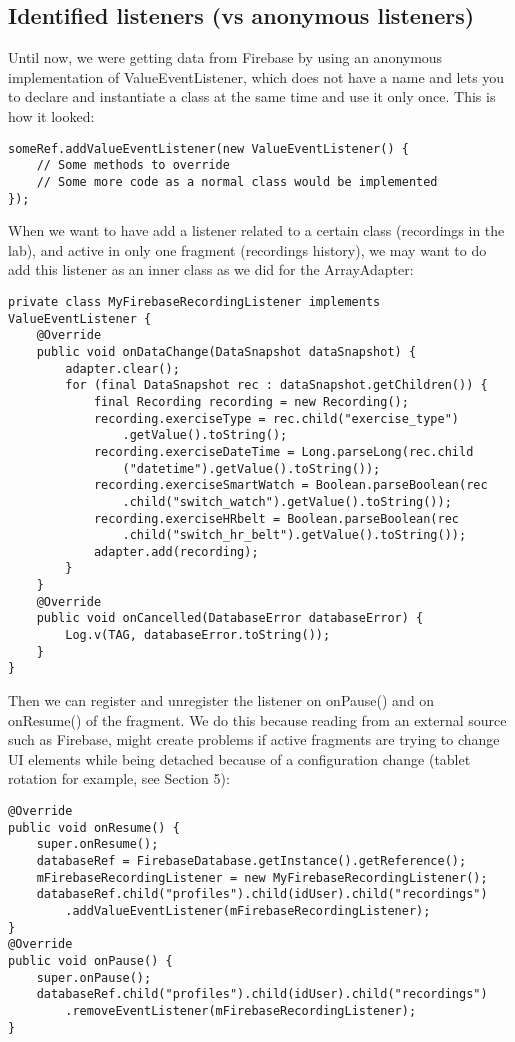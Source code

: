 \documentclass[11pt]{article}
\begin{document}
\subsection{Identified listeners (vs anonymous listeners)}
Until now, we were getting data from Firebase by using an anonymous implementation of ValueEventListener, which does not have a name and lets you to declare and instantiate a class at the same time and use it only once. This is how it looked:
\begin{lstlisting}
someRef.addValueEventListener(new ValueEventListener() {
    // Some methods to override
    // Some more code as a normal class would be implemented
});
\end{lstlisting}
When we want to have add a listener related to a certain class (recordings in the lab), and active in only one fragment (recordings history), we may want to do add this listener as an inner class as we did for the ArrayAdapter: 
\begin{lstlisting}
private class MyFirebaseRecordingListener implements ValueEventListener {
    @Override
    public void onDataChange(DataSnapshot dataSnapshot) {
        adapter.clear();
        for (final DataSnapshot rec : dataSnapshot.getChildren()) {
            final Recording recording = new Recording();
            recording.exerciseType = rec.child("exercise_type")
                .getValue().toString();
            recording.exerciseDateTime = Long.parseLong(rec.child
                ("datetime").getValue().toString());
            recording.exerciseSmartWatch = Boolean.parseBoolean(rec
                .child("switch_watch").getValue().toString());
            recording.exerciseHRbelt = Boolean.parseBoolean(rec
                .child("switch_hr_belt").getValue().toString());
            adapter.add(recording);
        }
    }
    @Override
    public void onCancelled(DatabaseError databaseError) {
        Log.v(TAG, databaseError.toString());
    }
}
\end{lstlisting}
Then we can register and unregister the listener on onPause() and on onResume() of the fragment. We do this because reading from an external source such as Firebase, might create problems if active fragments are trying to change UI elements while being detached because of a configuration change (tablet rotation for example, see Section 5):
\begin{lstlisting}
@Override
public void onResume() {
    super.onResume();
    databaseRef = FirebaseDatabase.getInstance().getReference();
    mFirebaseRecordingListener = new MyFirebaseRecordingListener();
    databaseRef.child("profiles").child(idUser).child("recordings")
        .addValueEventListener(mFirebaseRecordingListener);
}
@Override
public void onPause() {
    super.onPause();
    databaseRef.child("profiles").child(idUser).child("recordings")
        .removeEventListener(mFirebaseRecordingListener);
}
\end{lstlisting}
\end{document}
